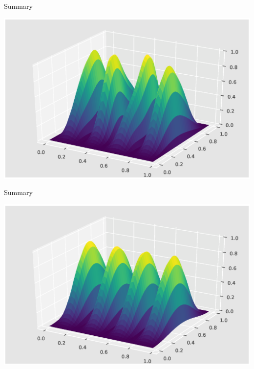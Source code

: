 \documentclass[mathserif]{beamer}
\begin{document}
\begin{frame}{Summary}

 \centering
 \includegraphics[scale=0.45]{images/psi8.eps}

\end{frame}

\begin{frame}{Summary}

 \centering
 \includegraphics[scale=0.45]{images/psi10.eps}

\end{frame}
\end{document}

